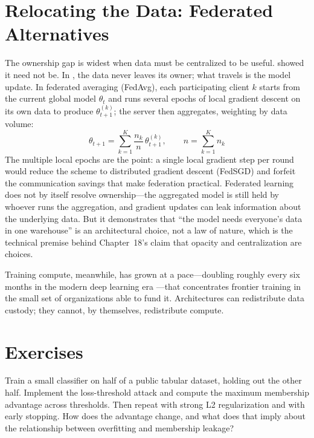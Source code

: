 \section{Relocating the Data: Federated Alternatives}
\label{sec:a18-federated}

The ownership gap is widest when data must be centralized to be useful. \textcite{mcmahan2017communication} showed it need not be. In , the data never leaves its owner; what travels is the model update. In federated averaging (FedAvg), each participating client $k$ starts from the current global model $\theta_t$ and runs several epochs of local gradient descent on its own data to produce $\theta_{t+1}^{(k)}$; the server then aggregates, weighting by data volume:
\[
\theta_{t+1} = \sum_{k=1}^{K} \frac{n_k}{n} \, \theta_{t+1}^{(k)},
\qquad n = \sum_{k=1}^{K} n_k
\]
The multiple local epochs are the point: a single local gradient step per round would reduce the scheme to distributed gradient descent (FedSGD) and forfeit the communication savings that make federation practical. Federated learning does not by itself resolve ownership---the aggregated model is still held by whoever runs the aggregation, and gradient updates can leak information about the underlying data. But it demonstrates that ``the model needs everyone's data in one warehouse'' is an architectural choice, not a law of nature, which is the technical premise behind Chapter~18's claim that opacity and centralization are choices.

Training compute, meanwhile, has grown at a pace---doubling roughly every six months in the modern deep learning era \autocite{sevilla2022compute}---that concentrates frontier training in the small set of organizations able to fund it. Architectures can redistribute data custody; they cannot, by themselves, redistribute compute.

\section{Exercises}
\label{sec:a18-exercises}

\begin{Exercise}
Train a small classifier on half of a public tabular dataset, holding out the other half. Implement the loss-threshold attack and compute the maximum membership advantage across thresholds. Then repeat with strong L2 regularization and with early stopping. How does the advantage change, and what does that imply about the relationship between overfitting and membership leakage?
\end{Exercise}

